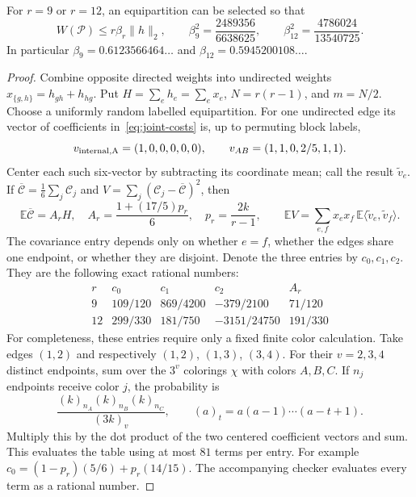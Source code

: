 \begin{lemma}\label{lem:joint-partition}
For $r=9$ or $r=12$, an equipartition can be selected so that
\[
 W(\mathcal P)\le r\beta_r\|h\|_2,
 \qquad
 \beta_9^2=\frac{2489356}{6638625},\qquad
 \beta_{12}^2=\frac{4786024}{13540725}.
\]
In particular $\beta_9=0.6123566464\ldots$ and
$\beta_{12}=0.5945200108\ldots$.
\end{lemma}
\begin{proof}
Combine opposite directed weights into undirected weights
$x_{\{g,h\}}=h_{gh}+h_{hg}$.  Put
$H=\sum_eh_e=\sum_ex_e$, $N=r(r-1)$, and $m=N/2$.
Choose a uniformly random labelled equipartition.  For one undirected
edge its vector of coefficients in~\eqref{eq:joint-costs} is, up to
permuting block labels,
\[
 v_{\rm internal,A}=(1,0,0,0,0,0),\qquad
 v_{AB}=(1,1,0,2/5,1,1).
\]
Center each such six-vector by subtracting its coordinate mean; call
the result $\widetilde v_e$.  If
$\overline{\mathcal C}=\frac16\sum_j\mathcal C_j$ and
$V=\sum_j(\mathcal C_j-\overline{\mathcal C})^2$, then
\[
 \mathbb E\overline{\mathcal C}=A_rH,
 \quad A_r=\frac{1+(17/5)p_r}{6},
 \quad p_r=\frac{2k}{r-1},
 \qquad
 \mathbb EV=\sum_{e,f}x_ex_f\,
              \mathbb E\langle\widetilde v_e,\widetilde v_f\rangle.
\]
The covariance entry depends only on whether $e=f$, whether the edges
share one endpoint, or whether they are disjoint.  Denote the three
entries by $c_0,c_1,c_2$.  They are the following exact rational numbers:
\[
\begin{array}{c|ccc|c}
 r&c_0&c_1&c_2&A_r\\\hline
 9&109/120&869/4200&-379/2100&71/120\\
 12&299/330&181/750&-3151/24750&191/330
\end{array}
\]
For completeness, these entries require only a fixed finite color
calculation.  Take edges $(1,2)$ and respectively $(1,2)$, $(1,3)$,
$(3,4)$.  For their $v=2,3,4$ distinct endpoints, sum over the $3^v$
colorings $\chi$ with colors $A,B,C$.  If $n_j$ endpoints receive color
$j$, the probability is
\[
 \frac{(k)_{n_A}(k)_{n_B}(k)_{n_C}}{(3k)_v},
 \qquad (a)_t=a(a-1)\cdots(a-t+1).
\]
Multiply this by the dot product of the two centered coefficient
vectors and sum.  This evaluates the table using at most $81$ terms per
entry.  For example $c_0=(1-p_r)(5/6)+p_r(14/15)$.
The accompanying checker evaluates every term as a rational number.


\end{proof}

